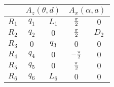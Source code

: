 \begin{tabular}{c|c|c|c|c|}  
            \cline{2-5} &
            \multicolumn{2}{|c|}{$A_z(\theta,d)$} &
            \multicolumn{2}{|c|}{$A_x(\alpha,a)$} \\
            \hline
        \multicolumn{1}{|c|}{$R_1$} & $q_{1}$ & $L_{1}$ & ${{\pi}\over{2}}$ & $0$ \\
            \hline
        \multicolumn{1}{|c|}{$R_2$} & $q_{2}$ & $0$ & ${{\pi}\over{2}}$ & $D_{2}$ \\
            \hline
        \multicolumn{1}{|c|}{$R_3$} & $0$ & $q_{3}$ & $0$ & $0$ \\
            \hline
        \multicolumn{1}{|c|}{$R_4$} & $q_{4}$ & $0$ & $-{{\pi}\over{2}}$ & $0$ \\
            \hline
        \multicolumn{1}{|c|}{$R_5$} & $q_{5}$ & $0$ & ${{\pi}\over{2}}$ & $0$ \\
            \hline
        \multicolumn{1}{|c|}{$R_6$} & $q_{6}$ & $L_{6}$ & $0$ & $0$ \\
            \hline
\end{tabular}
